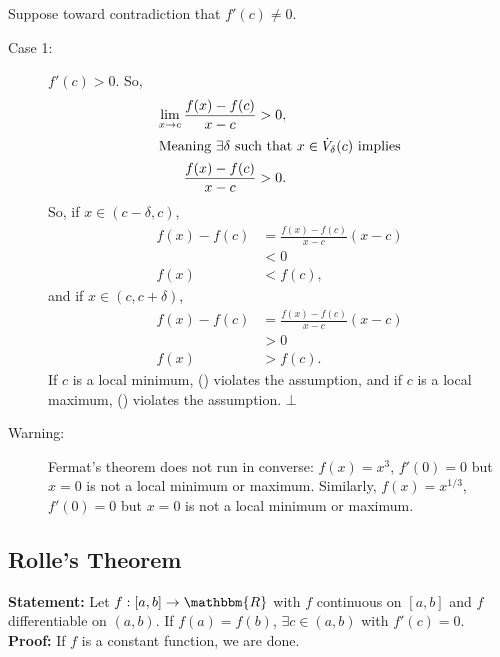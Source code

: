 \documentclass[10pt]{extarticle}
\newcommand{\R}{\mathbbm{R}}
\begin{document}
    Suppose toward contradiction that $f'(c) \neq 0$.
    \begin{description}
      \item[Case 1:] $f'(c) > 0$. So,
        \begin{align*}
          \lim_{x\rightarrow c}\frac{f(x)-f(c)}{x-c} &> 0,\\
          \shortintertext{Meaning $\exists \delta$ such that $x\in \dot{V}_{\delta}(c)$ implies}
          \frac{f(x)-f(c)}{x-c} &> 0.
        \end{align*}
        So, if $x\in (c-\delta,c)$,
        \begin{align*}
          f(x)-f(c) &= \frac{f(x)-f(c)}{x-c}(x-c)\\
                    &< 0\\
          f(x) &< f(c), \tag*{(\textasteriskcentered)}
        \end{align*}
        and if $x\in (c,c+\delta)$,
        \begin{align*}
          f(x)-f(c) &= \frac{f(x)-f(c)}{x-c}(x-c)\\
                    &> 0\\
          f(x) &> f(c).\tag*{(\textasteriskcentered\textasteriskcentered)}
        \end{align*}
        If $c$ is a local minimum, (\textasteriskcentered) violates the assumption, and if $c$ is a local maximum, (\textasteriskcentered\textasteriskcentered) violates the assumption. $\bot$
    \end{description}
    \begin{description}
      \item[Warning:] Fermat's theorem does not run in converse: $f(x) = x^3$, $f'(0) = 0$ but $x=0$ is not a local minimum or maximum. Similarly, $f(x) = x^{1/3}$, $f'(0)= 0$ but $x=0$ is not a local minimum or maximum.
    \end{description}
  \subsection{Rolle's Theorem}%

   \textbf{Statement:} Let $f: [a,b]\rightarrow \R$ with $f$ continuous on $[a,b]$ and $f$ differentiable on $(a,b)$. If $f(a) = f(b)$, $\exists c\in (a,b)$ with $f'(c) = 0$.\\

    \textbf{Proof:} If $f$ is a constant function, we are done.\\
\end{document}
